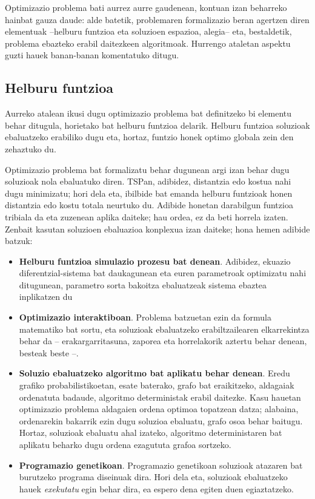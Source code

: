 \documentclass[eu]{ifirak}\usepackage[]{graphicx}\usepackage[]{color}
\begin{document}
Optimizazio problema bati aurrez aurre gaudenean, kontuan izan beharreko hainbat gauza daude: alde batetik, problemaren formalizazio beran agertzen diren elementuak --helburu funtzioa eta soluzioen espazioa, alegia-- eta,  bestaldetik, problema ebazteko erabil daitezkeen algoritmoak. Hurrengo ataletan aspektu guzti hauek banan-banan komentatuko ditugu.


\subsection{Helburu funtzioa}

Aurreko atalean ikusi dugu optimizazio problema bat definitzeko bi elementu behar ditugula, horietako bat helburu funtzioa delarik. Helburu funtzioa soluzioak ebaluatzeko erabiliko dugu eta, hortaz, funtzio honek optimo globala zein den zehaztuko du.

Optimizazio problema bat formalizatu behar dugunean argi izan behar dugu soluzioak nola ebaluatuko diren. TSPan, adibidez, distantzia edo kostua nahi dugu minimizatu; hori dela eta, ibilbide bat emanda helburu funtzioak honen distantzia edo kostu totala neurtuko du. Adibide honetan darabilgun funtzioa tribiala da eta zuzenean aplika daiteke; hau ordea, ez da beti horrela izaten. Zenbait kasutan soluzioen ebaluazioa konplexua izan daiteke; hona hemen adibide batzuk:

\begin{itemize}
\item \textbf{Helburu funtzioa simulazio prozesu bat denean}. Adibidez, ekuazio diferentzial-sistema bat daukagunean eta euren parametroak optimizatu nahi ditugunean, parametro sorta bakoitza ebaluatzeak sistema ebaztea inplikatzen du
\item \textbf{Optimizazio interaktiboan}\citep{takagi2001}. Problema batzuetan ezin da formula matematiko bat sortu, eta soluzioak ebaluatzeko erabiltzailearen elkarrekintza behar da -- erakargarritasuna, zaporea eta horrelakorik aztertu behar denean, besteak beste --.
\item \textbf{Soluzio ebaluatzeko algoritmo bat aplikatu behar denean}. Eredu grafiko probabilistikoetan, esate baterako, grafo bat eraikitzeko, aldagaiak ordenatuta badaude, algoritmo deterministak erabil daitezke. Kasu hauetan optimizazio problema aldagaien ordena optimoa topatzean datza; alabaina, ordenarekin bakarrik ezin dugu soluzioa ebaluatu, grafo osoa behar baitugu. Hortaz, soluzioak ebaluatu ahal izateko, algoritmo deterministaren bat aplikatu beharko dugu ordena ezagututa grafoa sortzeko.
\item \textbf{Programazio genetikoan}. Programazio genetikoan soluzioak atazaren bat burutzeko programa diseinuak dira. Hori dela eta, soluzioak ebaluatzeko hauek \textit{exekutatu} egin behar dira, ea espero dena egiten duen egiaztatzeko.
\end{itemize}
\end{document}

